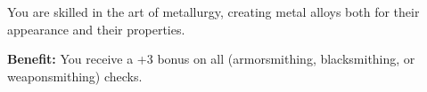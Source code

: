 
You are skilled in the art of metallurgy, creating metal alloys both for their appearance and their properties.

\textbf{Benefit:} You receive a +3 bonus on all  (armorsmithing, blacksmithing, or weaponsmithing) checks.